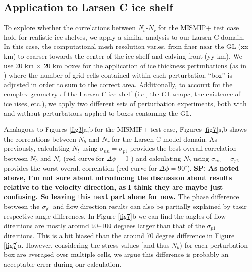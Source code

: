 \documentclass[review,oneside]{igs}
\begin{document}
\subsection{Application to Larsen C ice shelf}

To explore whether the correlations between $N_b$-$N_r$ for the MISMIP+ test case hold for realistic ice shelves, we apply a similar analysis to our Larsen C domain. In this case, the computational mesh resolution varies, from finer near the GL (xx km) to coarser towards the center of the ice shelf and calving front (yy km). We use 20 km $\times$ 20 km boxes for the application of ice thickness perturbations (as in \citet{reese2018}) where the number of grid cells contained within each perturbation ``box'' is adjusted in order to sum to the correct area. Additionally, to account for the complex geometry of the Larsen C ice shelf (i.e., the GL shape, the existence of ice rises, etc.), we apply two different sets of perturbation experiments, both with and without perturbations applied to boxes containing the GL. %

Analagous to Figures \ref{fig3}a,b for the MISMIP+ test case, Figures \ref{fig7}a,b shows the correlations between $N_b$ and $N_r$ for the Larsen C model domain. As previously, calculating $N_b$ using $\sigma_{nn}=\sigma_{p1}$ provides the best overall correlation between $N_b$ and $N_r$ (red curve for $\Delta\phi=0^\circ$) and calculating $N_b$ using $\sigma_{nn}=\sigma_{p2}$ provides the worst overall correlation (red curve for $\Delta\phi=90^\circ$). \textbf{SP: As noted above, I'm not sure about introducing the discussion about results relative to the velocity direction, as I think they are maybe just confusing. So leaving this next part alone for now.} The phase difference between the $\sigma_{p1}$ and flow direction results can also be partially explained by their respective angle differences. In Figure \ref{fig7}b we can find the angles of flow directions are mostly around 90--100 degrees larger than that of the $\sigma_{p1}$ directions. This is a bit biased than the around 70 degree difference in Figure \ref{fig7}a. However, considering the stress values (and thus $N_b$) for each perturbation box are averaged over multiple cells, we argue this difference is probably an acceptable error during our calculation.  
\end{document}
